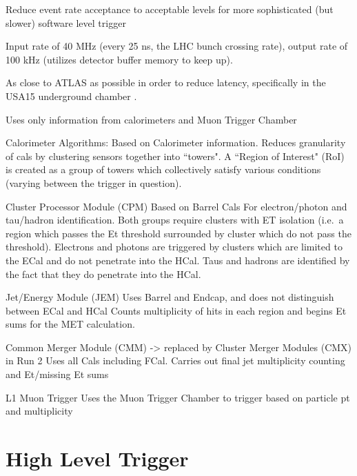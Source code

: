 Reduce event rate acceptance to acceptable levels for more sophisticated (but slower) software level trigger

Input rate of 40 MHz (every 25 ns, the LHC bunch crossing rate), output rate of 100 kHz (utilizes detector buffer memory to keep up). \cite{trigger_run2}

As close to ATLAS as possible in order to reduce latency, specifically in the USA15 underground chamber \cite{trigger_tdr}.


Uses only information from calorimeters and Muon Trigger Chamber


Calorimeter Algorithms: \cite{L1_calo_run1}
    Based on Calorimeter information.
    Reduces granularity of cals by clustering sensors together into ``towers".
    A ``Region of Interest" (RoI) is created as a group of towers which collectively satisfy various conditions (varying between the trigger in question).

    Cluster Processor Module (CPM)
        Based on Barrel Cals
        For electron/photon and tau/hadron identification.
        Both groups require clusters with ET isolation (i.e.\ a region which passes the Et threshold surrounded by cluster which do not pass the threshold).
        Electrons and photons are triggered by clusters which are limited to the ECal and do not penetrate into the HCal.
        Taus and hadrons are identified by the fact that they do penetrate into the HCal.

    Jet/Energy Module (JEM)
        Uses Barrel and Endcap, and does not distinguish between ECal and HCal
        Counts multiplicity of hits in each region and begins Et sums for the MET calculation.
        
    Common Merger Module (CMM) -> replaced by Cluster Merger Modules (CMX) in Run 2
        Uses all Cals including FCal.
        Carries out final jet multiplicity counting and Et/missing Et sums

L1 Muon Trigger
    Uses the Muon Trigger Chamber %
    to trigger based on particle pt and multiplicity



\section{High Level Trigger}


